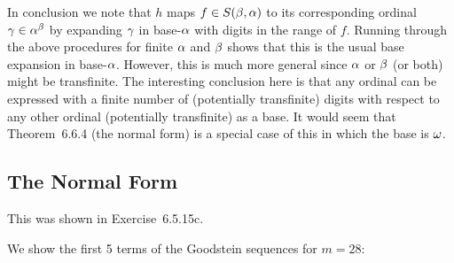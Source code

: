 \begin{solution}
    In conclusion we note that $h$ maps $f \in S(\beta,\alpha)$ to its corresponding ordinal $\gamma \in \alpha^\beta$ by expanding $\gamma$ in base-$\alpha$ with digits in the range of $f$.
    Running through the above procedures for finite $\alpha$ and $\beta$ shows that this is the usual base expansion in base-$\alpha$.
    However, this is much more general since $\alpha$ or $\beta$ (or both) might be transfinite.
    The interesting conclusion here is that any ordinal can be expressed with a finite number of (potentially transfinite) digits with respect to any other ordinal (potentially transfinite) as a base.
    It would seem that Theorem~6.6.4 (the normal form) is a special case of this in which the base is $\omega$.
\end{solution}

\subsection{The Normal Form}

\begin{solution}
	This was shown in Exercise~6.5.15c.
\end{solution}


\begin{solution}
	We show the first 5 terms of the Goodstein sequences for $m = 28$:
\end{solution}
